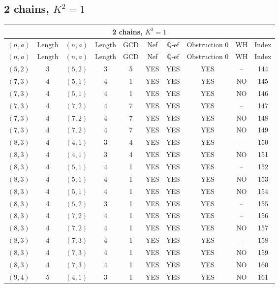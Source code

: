 \subsection{2 chains, $K^2 = 1$}
\begin{longtable}{|c|c|c|c|c|c|c|c|c|c|}
\hline
\multicolumn{10}{|c|}{2 chains, $K^2 = 1$}\\
\hline
$(n,a)$ & Length & $(n,a)$ & Length & GCD & Nef & $\mathbb Q$-ef & Obstruction 0 & WH & Index\\
\hline
\endfirsthead

\hline
$(n,a)$ & Length & $(n,a)$ & Length & GCD & Nef & $\mathbb Q$-ef & Obstruction 0 & WH & Index\\
\hline
\endhead
\hline
\endfoot

$(5, 2)$ & 3 & $(5, 2)$ & 3 & 5 & YES & YES & YES & -- & 144\\
$(7, 3)$ & 4 & $(5, 1)$ & 4 & 1 & YES & YES & YES & NO & 145\\
$(7, 3)$ & 4 & $(5, 1)$ & 4 & 1 & YES & YES & YES & NO & 146\\
$(7, 3)$ & 4 & $(7, 2)$ & 4 & 7 & YES & YES & YES & -- & 147\\
$(7, 3)$ & 4 & $(7, 2)$ & 4 & 7 & YES & YES & YES & NO & 148\\
$(7, 3)$ & 4 & $(7, 2)$ & 4 & 7 & YES & YES & YES & NO & 149\\
$(8, 3)$ & 4 & $(4, 1)$ & 3 & 4 & YES & YES & YES & -- & 150\\
$(8, 3)$ & 4 & $(4, 1)$ & 3 & 4 & YES & YES & YES & NO & 151\\
$(8, 3)$ & 4 & $(5, 1)$ & 4 & 1 & YES & YES & YES & -- & 152\\
$(8, 3)$ & 4 & $(5, 1)$ & 4 & 1 & YES & YES & YES & NO & 153\\
$(8, 3)$ & 4 & $(5, 1)$ & 4 & 1 & YES & YES & YES & NO & 154\\
$(8, 3)$ & 4 & $(5, 2)$ & 3 & 1 & YES & YES & YES & -- & 155\\
$(8, 3)$ & 4 & $(7, 2)$ & 4 & 1 & YES & YES & YES & -- & 156\\
$(8, 3)$ & 4 & $(7, 2)$ & 4 & 1 & YES & YES & YES & NO & 157\\
$(8, 3)$ & 4 & $(7, 3)$ & 4 & 1 & YES & YES & YES & -- & 158\\
$(8, 3)$ & 4 & $(7, 3)$ & 4 & 1 & YES & YES & YES & NO & 159\\
$(8, 3)$ & 4 & $(7, 3)$ & 4 & 1 & YES & YES & YES & NO & 160\\
$(9, 4)$ & 5 & $(4, 1)$ & 3 & 1 & YES & YES & YES & NO & 161\\

\end{longtable}
